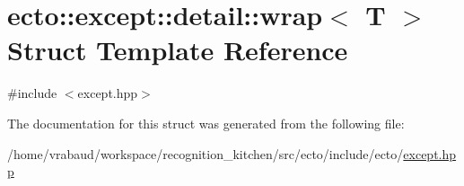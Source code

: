 \hypertarget{structecto_1_1except_1_1detail_1_1wrap}{\section{ecto\-:\-:except\-:\-:detail\-:\-:wrap$<$ T $>$ Struct Template Reference}
\label{structecto_1_1except_1_1detail_1_1wrap}
}


{\ttfamily \#include $<$except.\-hpp$>$}



The documentation for this struct was generated from the following file\-:\begin{DoxyCompactItemize}
\item 
/home/vrabaud/workspace/recognition\-\_\-kitchen/src/ecto/include/ecto/\hyperlink{except_8hpp}{except.\-hpp}\end{DoxyCompactItemize}
